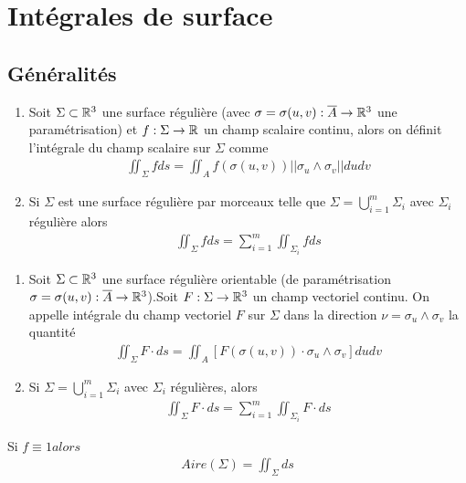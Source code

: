 \chapter[Intégrales de surfaces]{Intégrales de surface}

\section{Généralités}

\begin{myDefinition}
	\begin{enumerate}
		\item Soit $\Sigma\subset\mathbb{R}^3$ une surface régulière (avec $\sigma =\sigma(u,v):\overline{A}\rightarrow\mathbb{R}^3$ une paramétrisation) et $f:\Sigma\rightarrow\mathbb{R}$ un champ scalaire continu, alors on définit l'intégrale du champ scalaire sur $\Sigma$ comme
		\begin{eqnarray*}
			\iint_\Sigma fds=\iint_Af(\sigma(u,v))||\sigma_u\wedge\sigma_v||dudv
		\end{eqnarray*}
		\item Si $\Sigma$ est une surface régulière par morceaux telle que $\Sigma=\bigcup_{i=1}^{m}\Sigma_i$ avec $\Sigma_i$ régulière alors
		\begin{eqnarray*}
			\iint_\Sigma fds=\sum_{i=1}^m\iint_{\Sigma_i}fds
		\end{eqnarray*}
	\end{enumerate}
\end{myDefinition}

\begin{myDefinition}
	\begin{enumerate}
		\item Soit $\Sigma\subset\mathbb{R}^3$ une surface régulière orientable (de paramétrisation $\sigma =\sigma(u,v):\overline{A}\rightarrow\mathbb{R}^3$).Soit $F:\Sigma\rightarrow\mathbb{R}^3$ un champ vectoriel continu. On appelle intégrale du champ vectoriel $F$ sur $\Sigma$ dans la direction $\nu=\sigma_u\wedge\sigma_v$ la quantité
		\begin{eqnarray*}
			\iint_\Sigma F\cdot ds=\iint_A\left[F(\sigma(u,v))\cdot\sigma_u\wedge\sigma_v\right]dudv
		\end{eqnarray*}
		\item Si $\Sigma=\bigcup_{i=1}^{m}\Sigma_i$ avec $\Sigma_i$ régulières, alors
		\begin{eqnarray*}
			\iint_\Sigma F\cdot ds=\sum_{i=1}^m\iint_{\Sigma_i}F\cdot ds
		\end{eqnarray*}
	\end{enumerate}
\end{myDefinition}
\begin{myProperty}
	Si $f\equiv1 alors$
	\begin{eqnarray*}
		Aire(\Sigma)=\iint_\Sigma ds
	\end{eqnarray*}
\end{myProperty}

